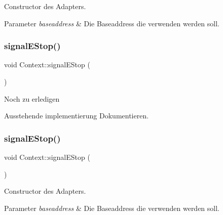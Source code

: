 Constructor des Adapters.


\begin{DoxyParams}{Parameter}
{\em baseaddress} & Die Baseaddress die verwenden werden soll. \\
\hline
\end{DoxyParams}
\hypertarget{class_context_a18bc1a709e3db9477e133f545f7cf66a}{}\label{class_context_a18bc1a709e3db9477e133f545f7cf66a} 
\subsubsection{\texorpdfstring{signal\+E\+Stop()}{signalEStop()}\hspace{0.1cm}{\footnotesize\ttfamily [1/2]}}
{\footnotesize\ttfamily void Context\+::signal\+E\+Stop (\begin{DoxyParamCaption}{ }\end{DoxyParamCaption})}

\begin{DoxyRefDesc}{Noch zu erledigen}
\item[\hyperlink{todo__todo000008}{Noch zu erledigen}]Ausstehende implementierung Dokumentieren. \end{DoxyRefDesc}
\hypertarget{class_context_a18bc1a709e3db9477e133f545f7cf66a}{}\label{class_context_a18bc1a709e3db9477e133f545f7cf66a} 
\subsubsection{\texorpdfstring{signal\+E\+Stop()}{signalEStop()}\hspace{0.1cm}{\footnotesize\ttfamily [2/2]}}
{\footnotesize\ttfamily void Context\+::signal\+E\+Stop (\begin{DoxyParamCaption}{ }\end{DoxyParamCaption})}

Constructor des Adapters.


\begin{DoxyParams}{Parameter}
{\em baseaddress} & Die Baseaddress die verwenden werden soll. \\
\hline
\end{DoxyParams}
\hypertarget{class_context_af78ea1902addcf137e8e7d99431592c6}{}\label{class_context_af78ea1902addcf137e8e7d99431592c6} 
